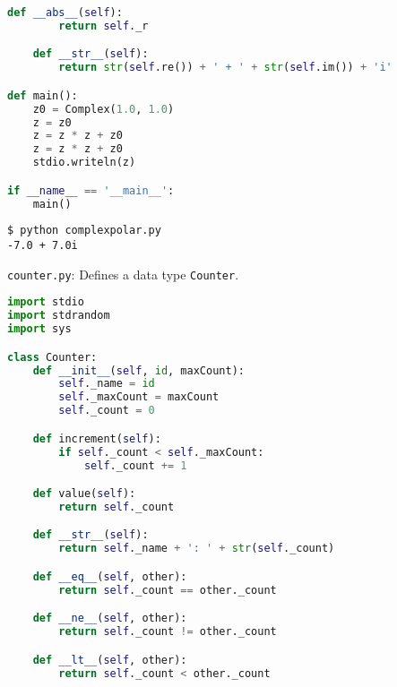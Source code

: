 \documentclass[8pt,a4paper,compress,handout]{beamer}
\begin{document}
\begin{frame}[fragile]
\begin{lstlisting}[language=Python]
    def __abs__(self):
        return self._r

    def __str__(self):
        return str(self.re()) + ' + ' + str(self.im()) + 'i'

def main():
    z0 = Complex(1.0, 1.0)
    z = z0
    z = z * z + z0
    z = z * z + z0
    stdio.writeln(z)

if __name__ == '__main__':
    main()
\end{lstlisting}

\begin{lstlisting}[language={}]
$ python complexpolar.py 
-7.0 + 7.0i
\end{lstlisting}
\end{frame}

\begin{frame}[fragile]
\begin{framed}
\tiny \lstinline{counter.py}: Defines a data type \lstinline{Counter}.
\end{framed}

\begin{lstlisting}[language=Python]
import stdio
import stdrandom
import sys

class Counter:
    def __init__(self, id, maxCount):
        self._name = id
        self._maxCount = maxCount
        self._count = 0

    def increment(self):
        if self._count < self._maxCount:
            self._count += 1

    def value(self):
        return self._count

    def __str__(self):
        return self._name + ': ' + str(self._count)

    def __eq__(self, other):
        return self._count == other._count

    def __ne__(self, other):
        return self._count != other._count

    def __lt__(self, other):
        return self._count < other._count
\end{lstlisting}
\end{frame}
\end{document}
